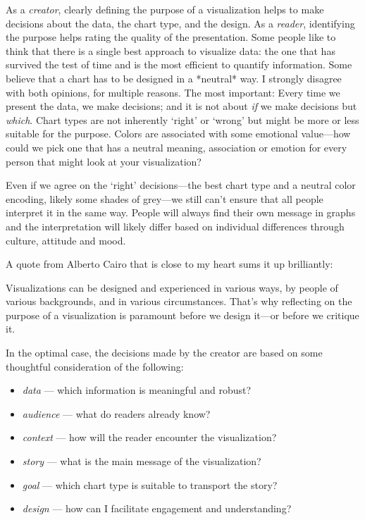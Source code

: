 \documentclass[
]{krantz}
\providecommand{\tightlist}{%
  \setlength{\itemsep}{0pt}\setlength{\parskip}{0pt}}
\renewenvironment{quote}{\begin{VF}}{\end{VF}}
\begin{document}
As a \emph{creator}, clearly defining the purpose of a visualization helps to
make decisions about the data, the chart type, and the design. As a
\emph{reader}, identifying the purpose helps rating the quality of the
presentation. Some people like to think that there is a single best
approach to visualize data: the one that has survived the test of time
and is the most efficient to quantify information. Some believe that a
chart has to be designed in a *neutral* way. I strongly disagree with
both opinions, for multiple reasons. The most important: Every time we
present the data, we make decisions; and it is not about \emph{if} we make
decisions but \emph{which}. Chart types are not inherently `right' or `wrong'
but might be more or less suitable for the purpose. Colors are
associated with some emotional value---how could we pick one that has a
neutral meaning, association or emotion for every person that might look
at your visualization?

Even if we agree on the `right' decisions---the best chart type and a
neutral color encoding, likely some shades of grey---we still can't
ensure that all people interpret it in the same way. People will always
find their own message in graphs and the interpretation will likely
differ based on individual differences through culture, attitude and
mood.

A quote from Alberto Cairo that is close to my heart sums it up
brilliantly:

\begin{quote}
Visualizations can be designed and experienced in various ways, by
people of various backgrounds, and in various circumstances. That's
why reflecting on the purpose of a visualization is paramount before
we design it---or before we critique it. \citep{cairo2021}
\end{quote}

In the optimal case, the decisions made by the creator are based on some
thoughtful consideration of the following:

\begin{itemize}
\tightlist
\item
  \emph{data} --- which information is meaningful and robust?
\item
  \emph{audience} --- what do readers already know?
\item
  \emph{context} --- how will the reader encounter the visualization?
\item
  \emph{story} --- what is the main message of the visualization?
\item
  \emph{goal} --- which chart type is suitable to transport the story?
\item
  \emph{design} --- how can I facilitate engagement and understanding?
\end{itemize}
\end{document}
